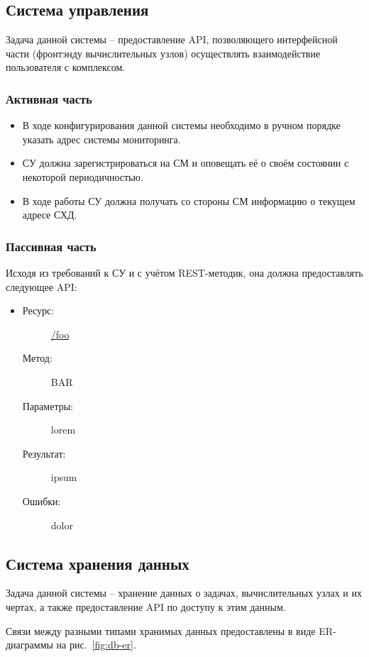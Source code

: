 \documentclass[a4paper,12pt]{report}
\numberwithin{equation}{section}
\begin{document}
\subsection{Система управления}
Задача данной системы -- предоставление API, позволяющего интерфейсной части (фронтэнду вычислительных узлов) осуществлять взаимодействие пользователя с комплексом.

\subsubsection{Активная часть}
\begin{itemize}
  \item В ходе конфигурирования данной системы необходимо в ручном порядке указать адрес системы мониторинга.
  \item СУ должна зарегистрироваться на СМ и оповещать её о своём состоянии с некоторой периодичностью.
  \item В ходе работы СУ должна получать со стороны СМ информацию о текущем адресе СХД.
\end{itemize}

\subsubsection{Пассивная часть}
Исходя из требований к СУ и с учётом REST-методик, она должна предоставлять следующее API:

\begin{itemize}
  \item
  \begin{description}
    \item[Ресурс:] \url{/foo}
    \item[Метод:] BAR
    \item[Параметры:] lorem
    \item[Результат:] ipsum
    \item[Ошибки:] dolor
  \end{description}
\end{itemize}

\subsection{Система хранения данных}
Задача данной системы -- хранение данных о задачах, вычислительных узлах и их чертах, а также предоставление API по доступу к этим данным.

Связи между разными типами хранимых данных предоставлены в виде ER-диаграммы на рис.~\ref{fig:db-er}.
\end{document}
